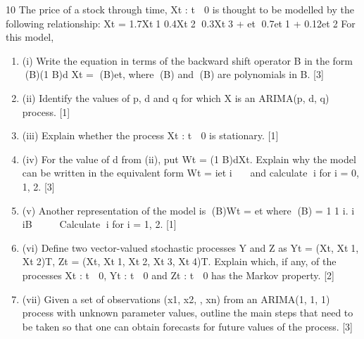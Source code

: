 \documentclass[a4paper,12pt]{article}
\begin{document}
\begin{enumerate}

10 The price of a stock through time, {Xt : t  0} is thought to be modelled by the
following relationship:
Xt = 1.7Xt1 	 0.4Xt2 	0.3Xt3 + et 	0.7et1 + 0.12et2
For this model,

\begin{enumerate}
\item (i) Write the equation in terms of the backward shift operator B in the form
(B)(1 	 B)d Xt = (B)et,
where (B) and (B) are polynomials in B. [3]
\item (ii) Identify the values of p, d and q for which X is an ARIMA(p, d, q) process. [1]
\item (iii) Explain whether the process {Xt : t  0} is stationary. [1]
\item (iv) For the value of d from (ii), put Wt = (1 	 B)dXt. Explain why the model can
be written in the equivalent form
Wt = iet i  
and calculate i for i = 0, 1, 2. [3]
\item (v) Another representation of the model is
(B)Wt = et
where (B) = 1 	 1 i.
i iB 

  Calculate i for i = 1, 2. [1]
\item (vi) Define two vector-valued stochastic processes Y and Z as
Yt = (Xt, Xt1, Xt2)T, Zt = (Xt, Xt1, Xt2, Xt3, Xt4)T.
Explain which, if any, of the processes {Xt : t  0}, {Yt : t  0} and {Zt : t  0}
has the Markov property. [2]
\item (vii) Given a set of observations (x1, x2, , xn) from an ARIMA(1, 1, 1) process
with unknown parameter values, outline the main steps that need to be taken
so that one can obtain forecasts for future values of the process. [3]
\end{enumerate}

\newpage


\end{enumerate}
\end{document}
